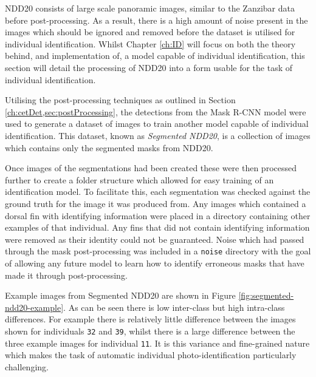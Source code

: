 NDD20 consists of large scale panoramic images, similar to the Zanzibar data before post-processing. As a result, there is a high amount of noise present in the images which should be ignored and removed before the dataset is utilised for individual identification. Whilst Chapter \ref{ch:ID} will focus on both the theory behind, and implementation of, a model capable of individual identification, this section will detail the processing of NDD20 into a form usable for the task of individual identification.

Utilising the post-processing techniques as outlined in Section \ref{ch:cetDet,sec:postProcessing}, the detections from the Mask R-CNN model were used to generate a dataset of images to train another model capable of individual identification. This dataset, known as \textit{Segmented NDD20}, is a collection of images which contains only the segmented masks from NDD20. 

Once images of the segmentations had been created these were then processed further to create a folder structure which allowed for easy training of an identification model. To facilitate this, each segmentation was checked against the ground truth for the image it was produced from. Any images which contained a dorsal fin with identifying information were placed in a directory containing other examples of that individual. Any fins that did not contain identifying information were removed as their identity could not be guaranteed. Noise which had passed through the mask post-processing was included in a \texttt{noise} directory with the goal of allowing any future model to learn how to identify erroneous masks that have made it through post-processing. 

Example images from Segmented NDD20 are shown in Figure \ref{fig:segmented-ndd20-example}. As can be seen there is low inter-class but high intra-class differences. For example there is relatively little difference between the images shown for individuals \texttt{32} and \texttt{39}, whilst there is a large difference between the three example images for individual \texttt{11}. It is this variance and fine-grained nature which makes the task of automatic individual photo-identification particularly challenging. 

